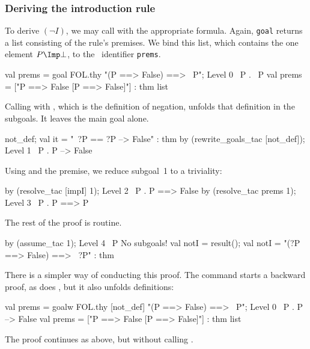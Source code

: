 \subsubsection{Deriving the introduction rule}
To derive $(\neg I)$, we may call  with the appropriate
formula.  Again, {\tt goal} returns a list consisting of the rule's
premises.  We bind this list, which contains the one element $P\Imp\bot$,
to the \ML\ identifier {\tt prems}.
\begin{ttbox}
val prems = goal FOL.thy "(P ==> False) ==> ~P";
{\out Level 0}
{\out ~P}
{. ~P}
{\out val prems = ["P ==> False  [P ==> False]"] : thm list}
\end{ttbox}
Calling  with , which is the
definition of negation, unfolds that definition in the subgoals.  It leaves
the main goal alone.
\begin{ttbox}
not_def;
{\out val it = "~?P == ?P --> False" : thm}
by (rewrite_goals_tac [not_def]);
{\out Level 1}
{\out ~P}
{. P --> False}
\end{ttbox}
Using  and the premise, we reduce subgoal~1 to a triviality:
\begin{ttbox}
by (resolve_tac [impI] 1);
{\out Level 2}
{\out ~P}
{. P ==> False}
\ttbreak
by (resolve_tac prems 1);
{\out Level 3}
{\out ~P}
{. P ==> P}
\end{ttbox}
The rest of the proof is routine.
\begin{ttbox}
by (assume_tac 1);
{\out Level 4}
{\out ~P}
{\out No subgoals!}
val notI = result();
{\out val notI = "(?P ==> False) ==> ~?P" : thm}
\end{ttbox}

\medskip
There is a simpler way of conducting this proof.  The 
command starts a backward proof, as does , but it also
unfolds definitions:
\begin{ttbox}
val prems = goalw FOL.thy [not_def]
    "(P ==> False) ==> ~P";
{\out Level 0}
{\out ~P}
{. P --> False}
{\out val prems = ["P ==> False  [P ==> False]"] : thm list}
\end{ttbox}
The proof continues as above, but without calling .


